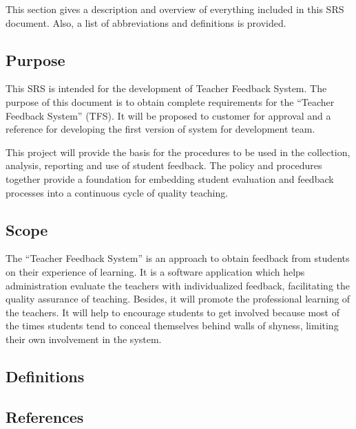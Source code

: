This section gives a description and overview of everything included
in this SRS document. Also, a list of abbreviations and definitions is
provided.

\subsection{Purpose}
This SRS is intended for the development of Teacher Feedback System. 
The purpose of this document is to obtain complete requirements for 
the “Teacher Feedback System” (TFS). It will be proposed to customer 
for approval and a reference for developing the first version of system
for development team.

This project will provide the basis for the procedures to be used in 
the collection, analysis, reporting and use of student feedback. The policy
and procedures together provide a foundation for embedding student evaluation
and feedback processes into a continuous cycle of quality teaching.

\subsection{Scope}
The “Teacher Feedback System” is an approach to obtain feedback from students
on their experience of learning. It is a software application which helps 
administration  evaluate the teachers with individualized feedback, facilitating
the quality assurance of teaching.
Besides, it will promote the professional learning of the teachers. It will help 
to encourage students to get involved because most of the times students tend to
conceal themselves behind walls of shyness, limiting their own involvement in the 
system. 

\subsection{Definitions}

\subsection{References}

